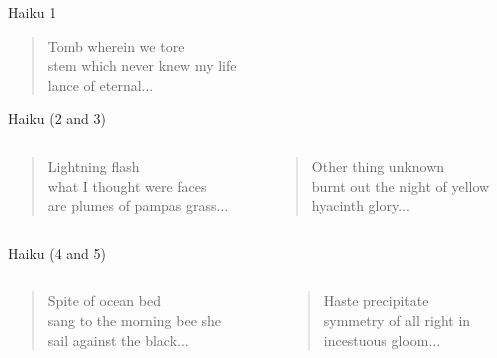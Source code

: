 \documentclass[xcolor={usenames,svgnames,x11names,dvipsnames,table}]{beamer}
\begin{document}
\begin{frame}{Haiku 1}
    \begin{quote}
\centering
Tomb wherein we tore\\
stem which never knew my life\\
lance of eternal...\\
\end{quote}
\end{frame}



\begin{frame}{Haiku (2 and 3)}

\begin{columns}[T]
    \begin{column}{.6\textwidth}
   
    \begin{quote}
Lightning flash\\
what I thought were faces\\
are plumes of pampas grass...\\
    \end{quote}
    \end{column}
        \begin{column}{.6\textwidth}
         \begin{quote}   
            Other thing unknown\\
burnt out the night of yellow\\
hyacinth glory...\\
\end{quote}
        \end{column}
        
        \end{columns}
        \end{frame}
        
        \begin{frame}{Haiku (4 and 5)}
        \begin{columns}[T]
    \begin{column}{.6\textwidth}
   \centering
    \begin{quote}
        Spite of ocean bed\\
sang to the morning bee she\\
sail against the black...\\
\end{quote}
 \end{column}
        \begin{column}{.6\textwidth}
         \begin{quote}

Haste precipitate\\
symmetry of all right in\\
incestuous gloom...\\
\end{quote}
                \end{column}
        
        \end{columns}
\end{frame}
\end{document}
